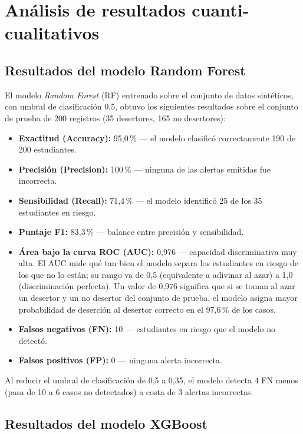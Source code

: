 \documentclass[12pt,letterpaper]{article}
\newcommand{\RF}{\textit{Random Forest} (RF)\xspace}
\begin{document}
\newpage

\section{Análisis de resultados cuanti-cualitativos}

\subsection{Resultados del modelo Random Forest}

El modelo \RF entrenado sobre el conjunto de datos sintéticos, con umbral de clasificación 0,5, obtuvo los siguientes resultados sobre el conjunto de prueba de 200 registros (35 desertores, 165 no desertores):

\begin{itemize}
  \item \textbf{Exactitud (Accuracy):} 95,0\,\% — el modelo clasificó correctamente 190 de 200 estudiantes.
  \item \textbf{Precisión (Precision):} 100\,\% — ninguna de las alertas emitidas fue incorrecta.
  \item \textbf{Sensibilidad (Recall):} 71,4\,\% — el modelo identificó 25 de los 35 estudiantes en riesgo.
  \item \textbf{Puntaje F1:} 83,3\,\% — balance entre precisión y sensibilidad.
  \item \textbf{Área bajo la curva ROC (AUC):} 0,976 — capacidad discriminativa muy alta. El AUC mide qué tan bien el modelo separa los estudiantes en riesgo de los que no lo están; su rango va de 0,5 (equivalente a adivinar al azar) a 1,0 (discriminación perfecta). Un valor de 0,976 significa que si se toman al azar un desertor y un no desertor del conjunto de prueba, el modelo asigna mayor probabilidad de deserción al desertor correcto en el 97,6\,\% de los casos.
  \item \textbf{Falsos negativos (FN):} 10 — estudiantes en riesgo que el modelo no detectó.
  \item \textbf{Falsos positivos (FP):} 0 — ninguna alerta incorrecta.
\end{itemize}

Al reducir el umbral de clasificación de 0,5 a 0,35, el modelo detecta 4 FN menos (pasa de 10 a 6 casos no detectados) a costa de 3 alertas incorrectas.

\subsection{Resultados del modelo XGBoost}
\end{document}
